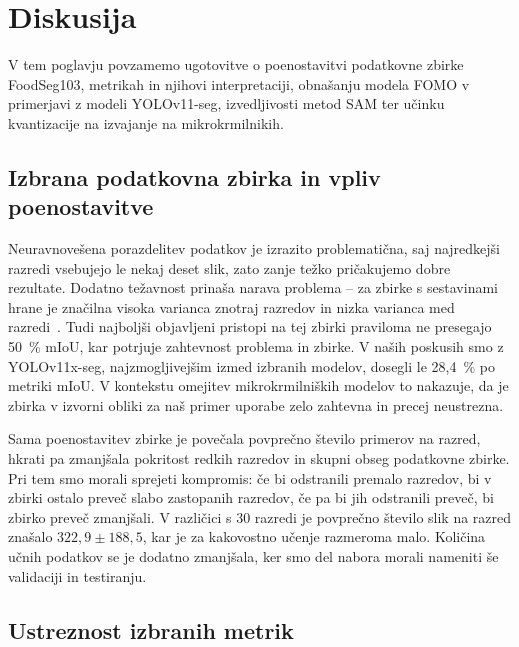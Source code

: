 \documentclass[a4paper,twoside,openright,12pt,slovene]{book}
\begin{document}
\chapter{Diskusija} \label{sct:diskusija}

        V tem poglavju povzamemo ugotovitve o poenostavitvi podatkovne zbirke
        FoodSeg103, metrikah in njihovi interpretaciji, obnašanju modela FOMO v
        primerjavi z modeli YOLOv11-seg, izvedljivosti metod SAM ter učinku
        kvantizacije na izvajanje na mikrokrmilnikih.

    \section{Izbrana podatkovna zbirka in vpliv poenostavitve}
    
        Neuravnovešena porazdelitev podatkov je izrazito problematična, saj
        najredkejši razredi vsebujejo le nekaj deset slik, zato zanje težko
        pričakujemo dobre rezultate. Dodatno težavnost prinaša narava problema
        -- za zbirke s sestavinami hrane je značilna visoka varianca znotraj
        razredov in nizka varianca med razredi~\cite{src:wu2021large}. Tudi
        najboljši objavljeni pristopi na tej zbirki praviloma ne presegajo
        50~\% mIoU, kar potrjuje zahtevnost problema in zbirke. V naših
        poskusih smo z YOLOv11x-seg, najzmogljivejšim izmed izbranih modelov,
        dosegli le 28{,}4~\% po metriki mIoU. V kontekstu omejitev
        mikrokrmilniških modelov to nakazuje, da je zbirka v izvorni obliki za
        naš primer uporabe zelo zahtevna in precej neustrezna.

        Sama poenostavitev zbirke je povečala povprečno število primerov na
        razred, hkrati pa zmanjšala pokritost redkih razredov in skupni obseg
        podatkovne zbirke. Pri tem smo morali sprejeti kompromis: če bi
        odstranili premalo razredov, bi v zbirki ostalo preveč slabo zastopanih
        razredov, če pa bi jih odstranili preveč, bi zbirko preveč zmanjšali. V
        različici s 30 razredi je povprečno število slik na razred znašalo
        \(322{,}9 \pm 188{,}5\), kar je za kakovostno učenje razmeroma malo.
        Količina učnih podatkov se je dodatno zmanjšala, ker smo del nabora morali nameniti
        še validaciji in testiranju.

    
      
    \section{Ustreznost izbranih metrik}
\end{document}
